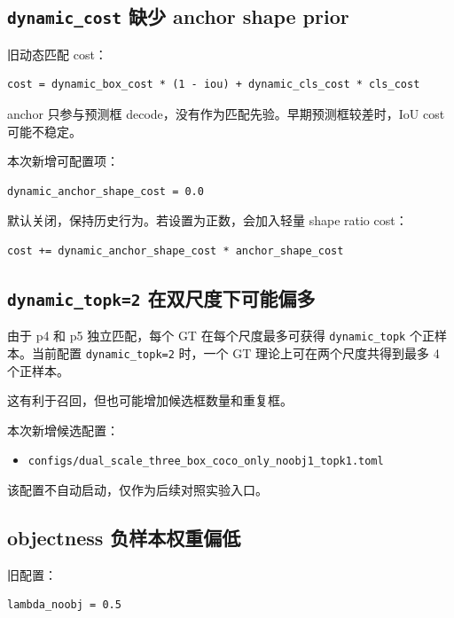 \documentclass[UTF8]{ctexart}
\begin{document}
\subsection{\texttt{dynamic\_cost} 缺少 anchor shape prior}

旧动态匹配 cost：

\begin{verbatim}
cost = dynamic_box_cost * (1 - iou) + dynamic_cls_cost * cls_cost
\end{verbatim}

anchor 只参与预测框 decode，没有作为匹配先验。早期预测框较差时，IoU cost 可能不稳定。

本次新增可配置项：

\begin{verbatim}
dynamic_anchor_shape_cost = 0.0
\end{verbatim}

默认关闭，保持历史行为。若设置为正数，会加入轻量 shape ratio cost：

\begin{verbatim}
cost += dynamic_anchor_shape_cost * anchor_shape_cost
\end{verbatim}

\subsection{\texttt{dynamic\_topk=2} 在双尺度下可能偏多}

由于 p4 和 p5 独立匹配，每个 GT 在每个尺度最多可获得 \texttt{dynamic\_topk} 个正样本。当前配置 \texttt{dynamic\_topk=2} 时，一个 GT 理论上可在两个尺度共得到最多 4 个正样本。

这有利于召回，但也可能增加候选框数量和重复框。

本次新增候选配置：

\begin{itemize}[leftmargin=2em]
  \item \texttt{configs/dual\_scale\_three\_box\_coco\_only\_noobj1\_topk1.toml}
\end{itemize}

该配置不自动启动，仅作为后续对照实验入口。

\subsection{objectness 负样本权重偏低}

旧配置：

\begin{verbatim}
lambda_noobj = 0.5
\end{verbatim}
\end{document}
